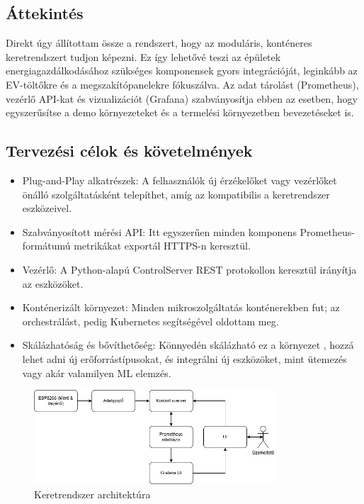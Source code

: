 \subsection{Áttekintés}

Direkt úgy állítottam össze a rendszert, hogy az moduláris, konténeres keretrendszert tudjon képezni. 
Ez így lehetővé teszi az épületek energiagazdálkodásához szükséges komponensek gyors integrációját, 
leginkább az EV-töltőkre és a megszakítópanelekre fókuszálva. Az adat tárolást (Prometheus), 
vezérlő API-kat és vizualizációt (Grafana) szabványosítja ebben az esetben, hogy egyszerűsítse a 
demo környezeteket és a termelési környezetben bevezetéseket is.

\subsection{Tervezési célok és követelmények}

\begin{itemize}
    \item Plug-and-Play alkatrészek: A felhasználók új érzékelőket vagy vezérlőket önálló szolgáltatásként telepíthet, 
    amíg az kompatibilis a keretrendszer eszközeivel.
    \item Szabványosított mérési API: Itt egyszerűen minden komponens Prometheus-formátumú metrikákat exportál HTTPS-n 
    keresztül.
    \item Vezérlő: A Python-alapú ControlServer REST protokollon keresztül irányítja az eszközöket.
    \item Konténerizált környezet: Minden mikroszolgáltatás konténerekben fut; az orchestrálást, 
    pedig Kubernetes segítségével oldottam meg.
    \item Skálázhatóság és bővíthetőség: Könnyedén skálázható ez a környezet , hozzá lehet adni új erőforrástípusokat, 
    és integrálni új eszközöket, mint ütemezés vagy akár valamilyen ML elemzés.
\end{itemize}

\begin{figure}[!ht]
    \centering
    \includegraphics[width=0.8\textwidth, keepaspectratio]{figures/framework.png}
    \caption{Keretrendszer architektúra}
\end{figure}

